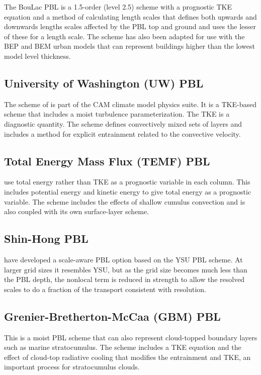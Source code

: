 The BouLac PBL \citep{bougeault89} is a 1.5-order (level 2.5) scheme with a prognostic TKE equation and a method of calculating length scales
that defines both upwards and downwards lengths scales affected by the PBL top and ground and uses the lesser of these for a length scale.
The scheme has also been adapted for use with the BEP and BEM urban models that can represent buildings higher than the lowest model level
thickness.

\subsection{University of Washington (UW) PBL}

The scheme of \citet{bretherton09} is part of the CAM climate model physics suite. It is a TKE-based scheme that includes a
moist turbulence parameterization. The TKE is a diagnostic quantity. The scheme defines convectively mixed sets of layers
and includes a method for explicit entrainment related to the convective velocity.

\subsection{Total Energy Mass Flux (TEMF) PBL}

\citet{angevine10} use total energy rather than TKE as a prognostic variable in each column. This includes potential energy and kinetic
energy to give total energy as a prognostic variable.
The scheme includes the effects of shallow cumulus convection and is also coupled with its own surface-layer scheme.

\subsection{Shin-Hong PBL}

\citet{shin15} have developed a scale-aware PBL option based on the YSU PBL scheme. At larger grid sizes it
resembles YSU, but as the grid size becomes much less than the PBL depth, the nonlocal term is reduced in
strength to allow the resolved scales to do a fraction of the transport consistent with resolution.

\subsection{Grenier-Bretherton-McCaa (GBM) PBL}

This is a moist PBL scheme \citet{grenier01} that can also represent cloud-topped boundary layers such as marine stratocumulus.
The scheme includes a TKE equation and the effect of cloud-top radiative cooling that modifies the entrainment
and TKE, an important process for stratocumulus clouds.


